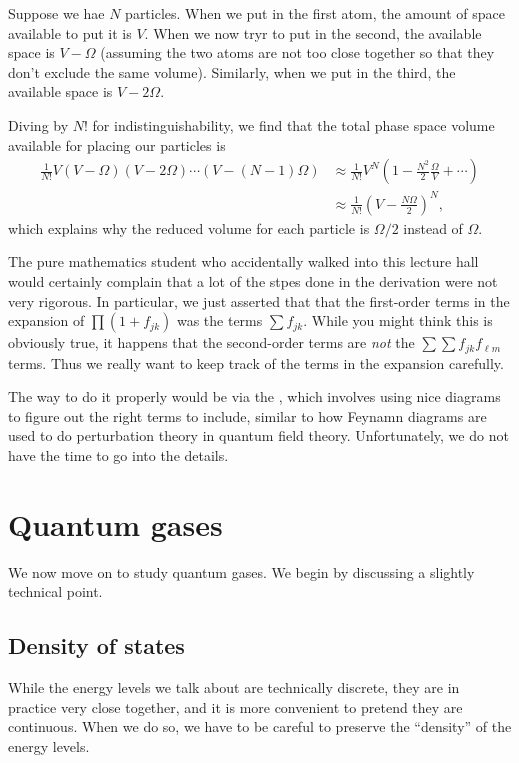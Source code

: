 \documentclass[a4paper]{article}
\begin{document}
Suppose we hae $N$ particles. When we put in the first atom, the amount of space available to put it is $V$. When we now tryr to put in the second, the available space is $V - \Omega$ (assuming the two atoms are not too close together so that they don't exclude the same volume). Similarly, when we put in the third, the available space is $V - 2 \Omega$.

Diving by $N!$ for indistinguishability, we find that the total phase space volume available for placing our particles is
\begin{align*}
  \frac{1}{N!}V(V - \Omega) (V -2\Omega) \cdots (V - (N - 1) \Omega) &\approx \frac{1}{N!} V^N\left(1 - \frac{N^2}{2} \frac{\Omega}{V} + \cdots\right)\\
  &\approx \frac{1}{N!} \left(V - \frac{N\Omega}{2}\right)^N,
\end{align*}
which explains why the reduced volume for each particle is $\Omega/2$ instead of $\Omega$.

The pure mathematics student who accidentally walked into this lecture hall would certainly complain that a lot of the stpes done in the derivation were not very rigorous. In particular, we just asserted that that the first-order terms in the expansion of $\prod (1 + f_{jk})$ was the terms $\sum f_{jk}$. While you might think this is obviously true, it happens that the second-order terms are \emph{not} the $\sum \sum f_{jk} f_{\ell m}$ terms. Thus we really want to keep track of the terms in the expansion carefully.

The way to do it properly would be via the , which involves using nice diagrams to figure out the right terms to include, similar to how Feynamn diagrams are used to do perturbation theory in quantum field theory. Unfortunately, we do not have the time to go into the details.


\section{Quantum gases}
We now move on to study quantum gases. We begin by discussing a slightly technical point.

\subsection{Density of states}
While the energy levels we talk about are technically discrete, they are in practice very close together, and it is more convenient to pretend they are continuous. When we do so, we have to be careful to preserve the ``density'' of the energy levels.
\end{document}
